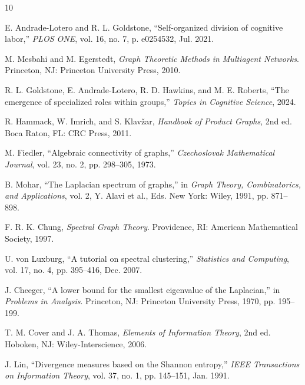 \documentclass[journal]{IEEEtran}
\begin{document}

\begin{thebibliography}{10}

E. Andrade-Lotero and R. L. Goldstone, ``Self-organized division of cognitive labor,'' \textit{PLOS ONE}, vol. 16, no. 7, p. e0254532, Jul. 2021.

M. Mesbahi and M. Egerstedt, \textit{Graph Theoretic Methods in Multiagent Networks}. Princeton, NJ: Princeton University Press, 2010.

R. L. Goldstone, E. Andrade-Lotero, R. D. Hawkins, and M. E. Roberts, ``The emergence of specialized roles within groups,'' \textit{Topics in Cognitive Science}, 2024.

R. Hammack, W. Imrich, and S. Klav\v{z}ar, \textit{Handbook of Product Graphs}, 2nd ed. Boca Raton, FL: CRC Press, 2011.

M. Fiedler, ``Algebraic connectivity of graphs,'' \textit{Czechoslovak Mathematical Journal}, vol. 23, no. 2, pp. 298--305, 1973.

B. Mohar, ``The Laplacian spectrum of graphs,'' in \textit{Graph Theory, Combinatorics, and Applications}, vol. 2, Y. Alavi et al., Eds. New York: Wiley, 1991, pp. 871--898.

F. R. K. Chung, \textit{Spectral Graph Theory}. Providence, RI: American Mathematical Society, 1997.

U. von Luxburg, ``A tutorial on spectral clustering,'' \textit{Statistics and Computing}, vol. 17, no. 4, pp. 395--416, Dec. 2007.

J. Cheeger, ``A lower bound for the smallest eigenvalue of the Laplacian,'' in \textit{Problems in Analysis}. Princeton, NJ: Princeton University Press, 1970, pp. 195--199.

T. M. Cover and J. A. Thomas, \textit{Elements of Information Theory}, 2nd ed. Hoboken, NJ: Wiley-Interscience, 2006.

J. Lin, ``Divergence measures based on the Shannon entropy,'' \textit{IEEE Transactions on Information Theory}, vol. 37, no. 1, pp. 145--151, Jan. 1991.

\end{thebibliography}
\end{document}
